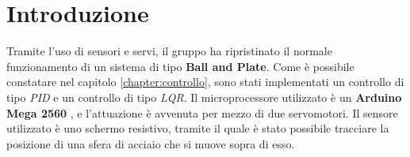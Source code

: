 \chapter{Introduzione}
\label{chapter:introduzione}

Tramite l'uso di sensori e servi, il gruppo ha ripristinato il normale funzionamento di un sistema di tipo \textbf{Ball and Plate}. Come è possibile constatare nel capitolo \ref{chapter:controllo}, sono stati implementati un controllo di tipo \textit{PID} e un controllo di tipo \textit{LQR}. Il microprocessore utilizzato è un \textbf{Arduino Mega 2560} \cite{arduino}, e l'attuazione è avvenuta per mezzo di due servomotori. Il sensore utilizzato è uno schermo resistivo, tramite il quale è stato possibile tracciare la posizione di una sfera di acciaio che si muove sopra di esso.